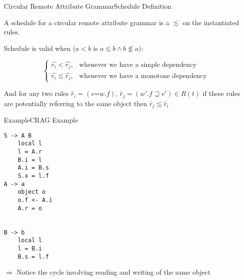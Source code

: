 \begin{frame}{Circular Remote Attribute Grammar}{Schedule Definition}
    
\begin{definition}
A schedule for a circular remote attribute grammar is a \alert{\customorder{}} $\lesssim$ on the \alert{instantiated rules}.
\end{definition}


Schedule is valid when ($a < b$ is $a \lesssim b \wedge b \not \lesssim a$):

\[\begin{cases}
      \hat{r_i} < \hat{r_j},    & \text{whenever we have a simple dependency} \\
      \hat{r_i} \lesssim \hat{r_j}, & \text{whenever we have a monotone dependency}
    \end{cases}\]

    And for any two rules $\hat{r}_i = (v \texttt{=} w.f)$, $\hat{r}_j = (w'.f \sqsupseteq v' ) \in R(t)$ if these rules are \alert{potentially} referring to the same object then $\hat{r}_j \lesssim \hat{r}_i$ 

\end{frame}




\begin{frame}[fragile=singleslide]{Example}{CRAG Example}

\begin{multicols}{3}
\begin{Verbatim}[fontsize=\small]
S -> A B
    local l
    l = A.r
    B.i = l
    A.i = B.s
    S.x = l.f
A -> a
    object o
    o.f <- A.i
    A.r = o


B -> b
    local l
    l = B.i
    B.s = l.f
\end{Verbatim}
\end{multicols}

\newlinevspace

$\Rightarrow$ Notice the \alert{cycle} involving reading and writing of the same object

\end{frame}

